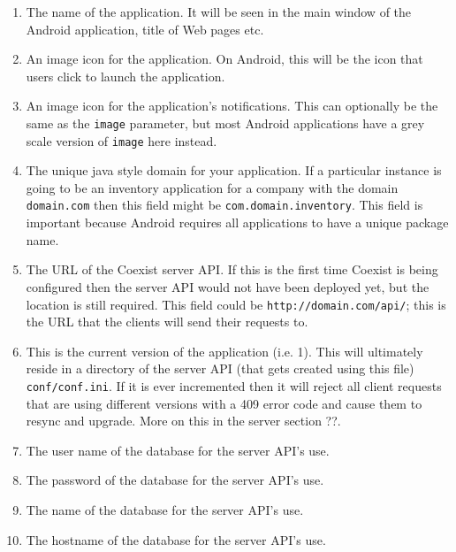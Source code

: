 \begin{enumerate}
    \setlength{\parskip}{0cm}%
\item {} The name of the application. It will be seen in the main window
  of the Android application, title of Web pages etc.

\item {} An image icon for the application. On Android, this will be the
  icon that users click to launch the application.

\item {} An image icon for the application's notifications. This
  can optionally be the same as the \texttt{image} parameter, but most Android
  applications have a grey scale version of \texttt{image} here instead.

\item {} The unique java style domain for your application. If a
  particular instance is going to be an inventory application for a company with
  the domain \texttt{domain.com} then this field might be \texttt{com.domain.inventory}.
  This field is important because Android requires all applications to have a
  unique package name. 

\item {} The URL of the Coexist server API. If this is the first time
  Coexist is being configured then the server API would not have been deployed
  yet, but the location is still required. This field could be
  \texttt{http://domain.com/api/}; this is the URL that the clients will send their
  requests to. 

\item {} This is the current version of the application (i.e. 1). This
  will ultimately reside in a directory of the server API (that gets created
  using this file) \texttt{conf/conf.ini}. If it is ever incremented then it will
  reject all client requests that are using different versions with a 409 error
  code and cause them to resync and upgrade. More on this in the server section
  ??.

\item {} The user name of the database for the server API's use.

\item {} The password of the database for the server API's use.

\item {} The name of the database for the server API's use.

\item {} The hostname of the database for the server API's use.


\end{enumerate}
